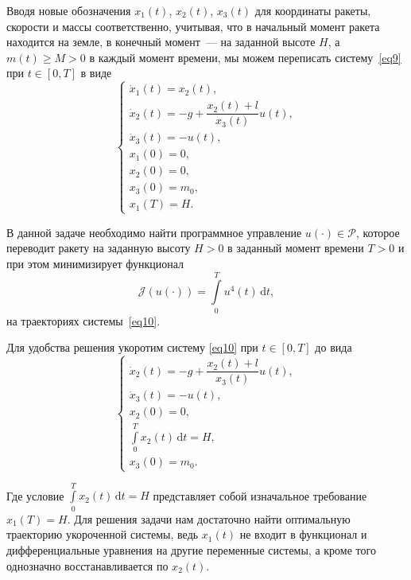 \documentclass[a4paper,12pt]{article}
\begin{document}
Вводя новые обозначения $x_1(t)$, $x_2(t)$, $x_3(t)$ для координаты ракеты, скорости и массы соответственно, учитывая, что в начальный момент ракета находится на земле, в конечный момент~--- на заданной высоте $H$, а $m(t) \geqslant M > 0$ в каждый момент времени, мы можем переписать систему~\eqref{eq9} при $t \in [0, T]$ в виде 
\hypertarget{p10}{}
\begin{equation} \label{eq10}
	\begin{cases} 
		\dot{x}_1(t) = x_2(t), \\
		\dot{x}_2(t) = -g + \dfrac{x_2(t) + l}{x_3(t)}u(t), \\
		\dot{x}_3(t) = -u(t), \\
		x_1(0) = 0, \\
		x_2(0) = 0, \\
		x_3(0) = m_0, \\
		x_1(T) = H. 
	\end{cases}
\end{equation}

В данной задаче необходимо найти программное управление $u(\cdot) \in \mathcal{P}$, которое переводит ракету на заданную высоту $H > 0$ в заданный момент времени $T > 0$ и при этом минимизирует функционал 
\[\mathcal{J}(u(\cdot)) = \int\limits_{0}^{T}{u^4(t)} \, \mathrm{d}t, \] на траекториях системы~\eqref{eq10}. 

Для удобства решения укоротим систему \eqref{eq10} при $t \in [0, T]$ до вида 
\hypertarget{p11}{}
\begin{equation} \label{eq11}
	\begin{cases} 
		\dot{x}_2(t) = -g + \dfrac{x_2(t) + l}{x_3(t)}u(t), \\
		\dot{x}_3(t) = -u(t), \\
		x_2(0) = 0, \\
		\int\limits_{0}^{T}{x_2(t)} \, \mathrm{d}t = H, \\
		x_3(0) = m_0. 
	\end{cases}
\end{equation}

Где условие $\int\limits_{0}^{T}{x_2(t)} \, \mathrm{d}t = H$ представляет собой изначальное требование $x_1(T) = H.$ Для решения задачи нам достаточно найти оптимальную траекторию укороченной системы, ведь $x_1(t)$ не входит в функционал и дифференциальные уравнения на другие переменные системы, а кроме того однозначно восстанавливается по $x_2(t).$
\end{document}
